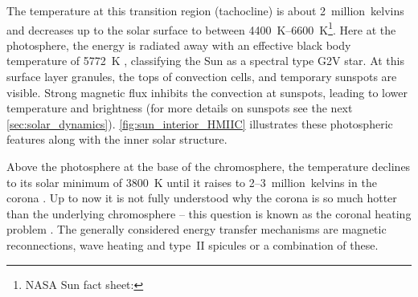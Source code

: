 The temperature at this transition region (tachocline) is about 2~million~kelvins and decreases up to the solar surface to between \SIrange{4400}{6600}{\K}\footnote{NASA Sun fact sheet: }. Here at the photosphere, the energy is radiated away with an effective black body temperature of \SI{5772}{\K} \citep{Mamajek2015}, classifying the Sun as a spectral type G2V star.
At this surface layer granules, the tops of convection cells, and temporary sunspots are visible. Strong magnetic flux inhibits the convection at sunspots, leading to lower temperature and brightness (for more details on sunspots see the next \autoref{sec:solar_dynamics}). \autoref{fig:sun_interior_HMIIC} illustrates these photospheric features along with the inner solar structure.
\begin{figure}[htb]
\end{figure}

Above the photosphere at the base of the chromosphere, the temperature declines to its solar minimum of \SI{3800}{\K} until it raises to \numrange{2}{3}~million~kelvins in the corona \citep{Billings1959,Liebenberg1975}. Up to now it is not fully understood why the corona is so much hotter than the underlying chromosphere -- this question is known as the coronal heating problem \citep{Fox2015}. The generally considered energy transfer mechanisms are magnetic reconnections, wave heating and type~II spicules or a combination of these.

